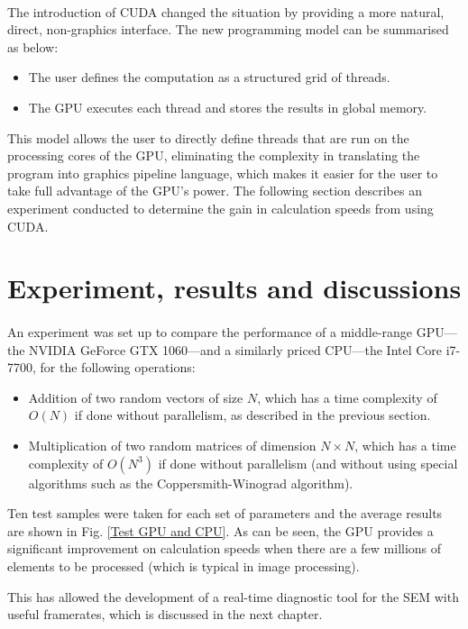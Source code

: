 \documentclass[12pt, twocolumn]{report}
\begin{document}
\paragraph{}
The introduction of CUDA changed the situation by providing a more natural, direct, non-graphics interface. The new programming model can be summarised as below:
\begin{itemize}
    \item The user defines the computation as a structured grid of threads.
    \item The GPU executes each thread and stores the results in global memory.
\end{itemize}
This model allows the user to directly define threads that are run on the processing cores of the GPU, eliminating the complexity in translating the program into graphics pipeline language, which makes it easier for the user to take full advantage of the GPU's power. The following section describes an experiment conducted to determine the gain in calculation speeds from using CUDA.

\section{Experiment, results and discussions}
\paragraph{}
An experiment was set up to compare the performance of a middle-range GPU---the NVIDIA GeForce GTX 1060---and a similarly priced CPU---the Intel Core i7-7700, for the following operations:
\begin{itemize}
    \item Addition of two random vectors of size $N$, which has a time complexity of $O(N)$ if done without parallelism, as described in the previous section.
    \item Multiplication of two random matrices of dimension $N \times N$, which has a time complexity of $O(N^3)$ if done without parallelism (and without using special algorithms such as the Coppersmith-Winograd algorithm).
\end{itemize}
Ten test samples were taken for each set of parameters and the average results are shown in Fig. \ref{Test GPU and CPU}. As can be seen, the GPU provides a significant improvement on calculation speeds when there are a few millions of elements to be processed (which is typical in image processing).

This has allowed the development of a real-time diagnostic tool for the SEM with useful framerates, which is discussed in the next chapter.
\end{document}
